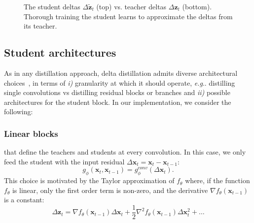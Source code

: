 \documentclass[runningheads]{llncs}
\makeatletter
\def\x{\mathbf{x}}
\def\z{\mathbf{z}}
\def\xt{\x_t}
\def\zt{\z_t}
\def\dzt{\Delta\zt}
\def\dxt{\Delta\xt}
\def\ztilde{\tilde{\mathbf{z}}}
\def\ftheta{f_{\theta}}
\def\gphi{g_{\phi}}
\DeclareRobustCommand\onedot{\futurelet\@let@token\@onedot}
\def\@onedot{\ifx\@let@token.\else.\null\fi\xspace}
\def\eg{\emph{e.g}\onedot} \def\Eg{\emph{E.g}\onedot}
\makeatother
\begin{document}
\bgroup
\setlength{\tabcolsep}{1.5pt}
\begin{figure}[t]
\centering
{}
\caption{The student deltas $\Delta\ztilde_t$ (top) vs. teacher deltas $\dzt$ (bottom). Thorough training the student learns to approximate the deltas from its teacher.}
\vspace{-4mm}
\label{fig:deltas}
\end{figure}
\egroup \subsection{Student architectures}\label{sec:student_architectures}
As in any distillation approach, delta distillation admits diverse architectural choices~\cite{distillationsurvey}, in terms of \textit{i)} granularity at which it should operate, \eg distilling single convolutions vs distilling residual blocks or branches and \textit{ii)} possible architectures for the student block.
In our implementation, we consider the following:
\subsubsection{Linear blocks} that define the teachers and students at every convolution. In this case, we only feed the student with the input residual $\dxt = \xt - \x_{t-1}$:
\begin{equation*}
\gphi(\xt, \x_{t-1}) = \gphi^{conv}(\dxt).
\end{equation*}
This choice is motivated by the Taylor approximation of $\ftheta$ where, if the function $\ftheta$ is linear, only the first order term is non-zero, and the derivative $\nabla\ftheta(\x_{t-1})$ is a constant:
\begin{equation}
\label{eq:taylor}
\dzt = \nabla\ftheta(\x_{t-1})\dxt + \frac{1}{2}\nabla^2\ftheta(\x_{t-1})\dxt^2 + \dots
\end{equation}
\end{document}

